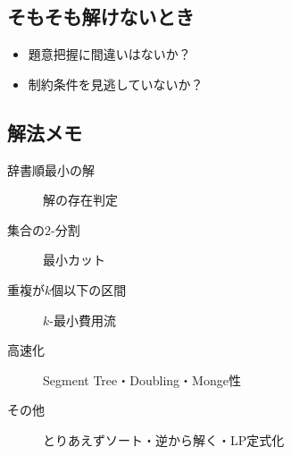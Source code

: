 \subsection{そもそも解けないとき}

\begin{itemize}
\item 題意把握に間違いはないか？
\item 制約条件を見逃していないか？
\end{itemize}

\subsection{解法メモ}

\begin{description}
\item[辞書順最小の解] 解の存在判定
\item[集合の$2$-分割] 最小カット
\item[重複が$k$個以下の区間] $k$-最小費用流
\item[高速化] Segment Tree・Doubling・Monge性
\item[その他] とりあえずソート・逆から解く・LP定式化
\end{description}

